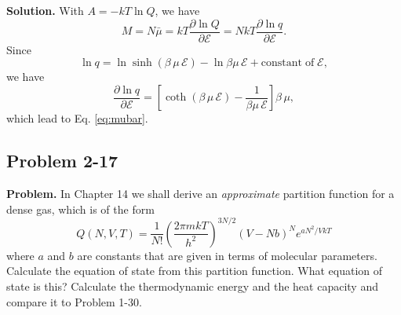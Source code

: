 \documentclass[twocolumn, 10pt]{article}
\numberwithin{equation}{section}
\newenvironment{problem}
{\par\medskip\sffamily \color{problue}
  \textbf{Problem. }\ignorespaces}
{\medskip}
\newenvironment{solution}
{\par\medskip
  \textbf{Solution. }\ignorespaces}
{\medskip}
\begin{document}
\begin{solution}
With $A = -kT \ln Q$, we have
$$
M = N \bar \mu = kT \frac{ \partial \ln Q } { \partial \mathscr E }
 = N kT \frac{ \partial \ln q } { \partial \mathscr E }.
$$
Since
$$
  \ln q = \ln \sinh(\beta \, \mu \, \mathscr E)
  - \ln{ \beta \mu \, \mathscr E}
  + \mathrm{constant \; of \; \mathscr E},
$$
we have
$$
\frac{ \partial \ln q } { \partial \mathscr E }
  = \left[
    \coth(\beta \, \mu \, \mathscr E)
  - \frac{1}{ \beta \mu \, \mathscr E}
  \right] \beta \, \mu,
$$
which lead to Eq. \eqref{eq:mubar}.

\begin{figure}[h]\centering
{}
\end{figure}

\end{solution}

\subsection{Problem 2-17}

\begin{problem}
In Chapter 14 we shall derive an \emph{approximate}
partition function for a dense gas,
which is of the form
$$
  Q(N, V, T)
  =
  \frac{1}{N!}
  \left( \frac{ 2\pi m k T }{ h^2 } \right)^{3N/2}
  (V - N b)^N e^{a N^2/V k T}
$$
where $a$ and $b$ are constants that are given
in terms of molecular parameters.
%
Calculate the equation of state from this partition function.
%
What equation of state is this?
%
Calculate the thermodynamic energy and the heat capacity
and compare it to Problem 1-30.
\end{problem}
\end{document}
